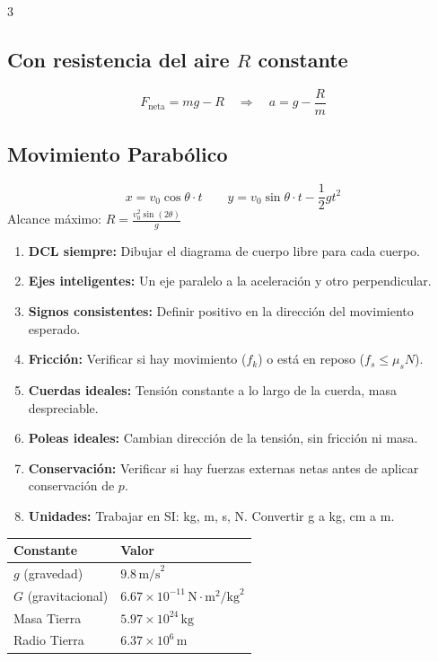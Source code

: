 \documentclass[10pt,landscape]{article}
\begin{document}
\begin{multicols}{3}
\subsection*{Con resistencia del aire $R$ constante}
\[
F_{\text{neta}} = mg - R \quad \Rightarrow \quad a = g - \frac{R}{m}
\]

\subsection*{Movimiento Parab\'{o}lico}
\[
x = v_0\cos\theta \cdot t \qquad y = v_0\sin\theta \cdot t - \frac{1}{2}gt^2
\]
Alcance m\'{a}ximo: $\displaystyle R = \frac{v_0^2\sin(2\theta)}{g}$

\vspace{4pt}

\begin{enumerate}[leftmargin=*,nosep,topsep=0pt]
  \item \textbf{DCL siempre:} Dibujar el diagrama de cuerpo libre para cada cuerpo.
  \item \textbf{Ejes inteligentes:} Un eje paralelo a la aceleraci\'{o}n y otro perpendicular.
  \item \textbf{Signos consistentes:} Definir positivo en la direcci\'{o}n del movimiento esperado.
  \item \textbf{Fricci\'{o}n:} Verificar si hay movimiento ($f_k$) o est\'{a} en reposo ($f_s \leq \mu_s N$).
  \item \textbf{Cuerdas ideales:} Tensi\'{o}n constante a lo largo de la cuerda, masa despreciable.
  \item \textbf{Poleas ideales:} Cambian direcci\'{o}n de la tensi\'{o}n, sin fricci\'{o}n ni masa.
  \item \textbf{Conservaci\'{o}n:} Verificar si hay fuerzas externas netas antes de aplicar conservaci\'{o}n de $p$.
  \item \textbf{Unidades:} Trabajar en SI: kg, m, s, N. Convertir g a kg, cm a m.
\end{enumerate}

\vspace{4pt}

\begin{center}
\begin{tabular}{@{}ll@{}}
\toprule
\textbf{Constante} & \textbf{Valor} \\
\midrule
$g$ (gravedad) & $9.8\,\text{m/s}^2$ \\
$G$ (gravitacional) & $6.67 \times 10^{-11}\,\text{N}\cdot\text{m}^2/\text{kg}^2$ \\
Masa Tierra & $5.97 \times 10^{24}\,\text{kg}$ \\
Radio Tierra & $6.37 \times 10^6\,\text{m}$ \\
\bottomrule
\end{tabular}
\end{center}

\end{multicols}
\end{document}
